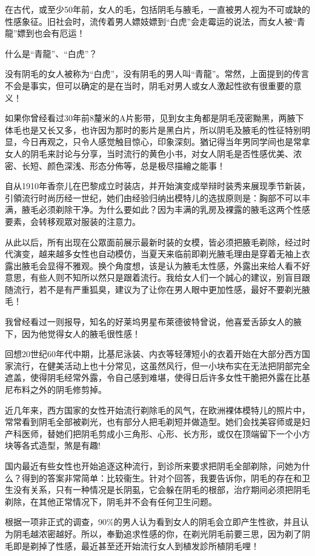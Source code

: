 \documentclass[12pt,UTF8]{ctexbook}
\begin{document}
在古代，或至少50年前，女人的毛，包括阴毛与腋毛，一直被男人视为不可或缺的性感象征。旧社会时，流传着男人嫖妓嫖到“白虎”会走霉运的说法，而女人被“青龍”嫖到也会有厄运！

什么是“青龍”、“白虎”？

没有阴毛的女人被称为“白虎”，没有阴毛的男人叫“青龍”。常然，上面提到的传言不会是事实，但可以确定的是在当时，阴毛对男人或女人激起性欲有很重要的意义！

如果你曾经看过30年前8釐米的A片影带，见到女主角都是阴毛茂密黝黑，两腋下体毛也是又长又多，也许因为那时的影片是黑白片，所以阴毛及腋毛的性征特别明显，今日再观之，只令人感觉触目惊心，印象深刻。猶记得当年男同学间也是常拿女人的阴毛来討论与分享，当时流行的黄色小书，对女人阴毛是否性感优美、浓密、长短、颜色深浅、形态分佈等，总是极尽描繪之能事！

自从1910年香奈儿在巴黎成立时装店，并开始演变成举辩时装秀来展现季节新装，引領流行时尚历经一世纪，她们由经验归纳出模特儿的选拔原则是：胸部不可以丰满，腋毛必须剃除干净。为什么要如此？因为丰满的乳房及裸露的腋毛这两个性感要素，会转移观眾对服装的注意力。

从此以后，所有出现在公眾面前展示最新时装的女模，皆必须把腋毛剃除，经过时代演变，越来越多女性也自动模仿，当夏天来临前即剃光腋毛理由是穿着无袖上衣露出腋毛会显得不雅观。换个角度想，该是认为腋毛太性感，外露出来给人看不好意思，有些人则不知所以然只是跟着流行。我给女人们一个誠心的建议，别盲目跟随流行，若不是有严重狐臭，建议为了让你在男人眼中更加性感，最好不要剃光腋毛！

我曾经看过一则报导，知名的好莱坞男星布萊德彼特曾说，他喜爱舌舔女人的腋下，因为他觉得女人的腋毛很性感！

回想20世纪60年代中期，比基尼泳装、内衣等轻薄短小的衣着开始在大部分西方国家流行，在健美活动上也十分常见，这虽然风行，但一小块布实在无法把阴部完全遮盖，使得阴毛经常外露，令自己感到难堪，使得日后许多女性干脆把外露在比基尼布料之外的阴毛修剪掉。

近几年来，西方国家的女性开始流行剃除毛的风气，在欧洲裸体模特儿的照片中，常常看到阴毛全部被剃光，也有部分人把毛剃短并做造型。她们会找美容师或是妇产科医师，替她们把阴毛剪成小三角形、心形、长方形，或仅在顶端留下一个小方块等各式造型，煞是有趣!

国内最近有些女性也开始追逐这种流行，到诊所来要求把阴毛全部剃除，问她为什么？得到的答案非常简单：比较衞生。针对个回答，我要告诉你，阴毛的存在和卫生没有关系，只有一种情况是长阴虱，它会躲在阴毛的根部，治疗期间必须把阴毛剃除，在其他正常情况下，阴毛并不会有任何卫生问题。

根据一项非正式的调查，90\%的男人认为看到女人的阴毛会立即产生性欲，并且认为阴毛越浓密越好。所以，奉勤追求性感的你，在剃光阴毛前要三思，因为剃了阴毛即是剃掉了性感，最近甚至还开始流行女人到植发診所植阴毛哩！
\end{document}
